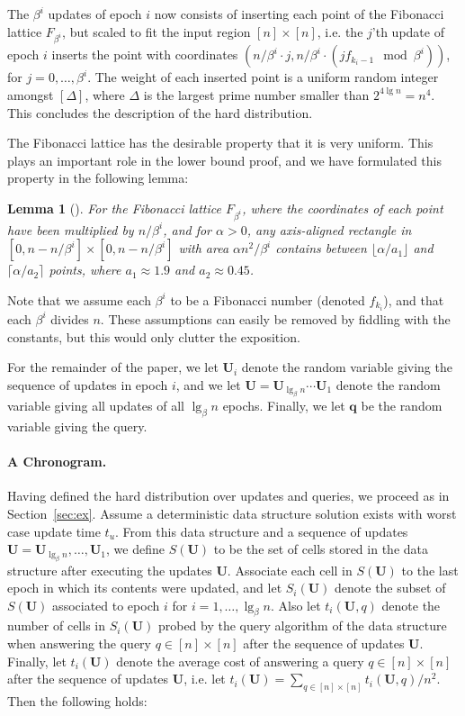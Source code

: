 \documentclass[letterpaper]{article}
\newtheorem{lemma}{Lemma}
\newcommand{\U}{\textbf{U}}
\newcommand{\q}{\textbf{q}}
\begin{document}
The $\beta^i$ updates of epoch $i$ now consists of inserting each
point of the Fibonacci lattice $F_{\beta^i}$, but scaled to fit the
input region $[n] \times [n]$, i.e. the $j$'th update of epoch $i$
inserts the point with coordinates $(n/\beta^i \cdot j,n/\beta^i \cdot
(jf_{k_i-1} \mod \beta^i))$, for $j=0,\dots,\beta^i$. The weight of
each inserted point is a uniform random integer amongst
$[\Delta]$, where $\Delta$ is the largest prime number
smaller than $2^{4 \lg n}=n^4$. This concludes the description of the hard
distribution.

The Fibonacci lattice has the desirable property that it is very
uniform. This plays an important role in the lower bound proof, and we
have formulated this property in the following lemma:

\begin{lemma}[\cite{fibonacci}]
\label{lem:fibarea}
For the Fibonacci lattice $F_{\beta^i}$, where the coordinates of each
point have been multiplied by $n/\beta^i$, and for $\alpha>0$, any
axis-aligned rectangle in $[0,n-n/\beta^i] \times [0,n-n/\beta^i]$
with area $\alpha n^2/\beta^i$ contains between $\lfloor \alpha / a_1
\rfloor$ and $\lceil \alpha/a_2 \rceil$ points, where $a_1 \approx
1.9$ and $a_2 \approx 0.45$.
\end{lemma}

Note that we assume each $\beta^i$ to be a Fibonacci number (denoted
$f_{k_i}$), and that each $\beta^i$ divides $n$. These assumptions can
easily be removed by fiddling with the constants, but this would only
clutter the exposition.

For the remainder of the paper, we let $\U_i$ denote the random
variable giving the sequence of updates in epoch $i$, and we let
$\U=\U_{\lg_\beta n}\cdots\U_1$ denote the random variable giving all
updates of all $\lg_\beta n$ epochs. Finally, we let $\q$ be the
random variable giving the query.

\paragraph{A Chronogram.}
Having defined the hard distribution over updates and queries, we
proceed as in Section~\ref{sec:ex}. Assume a deterministic data
structure solution exists with worst case update time $t_u$. From this
data structure and a sequence of updates $\U=\U_{\lg_\beta
  n},\dots,\U_1$, we define $S(\U)$ to be the set of cells stored in
the data structure after executing the updates $\U$. Associate each
cell in $S(\U)$ to the last epoch in which its contents were updated,
and let $S_i(\U)$ denote the subset of $S(\U)$ associated to epoch $i$
for $i=1,\dots,\lg_\beta n$. Also let $t_i(\U,q)$ denote the number of
cells in $S_i(\U)$ probed by the query algorithm of the data structure
when answering the query $q \in [n] \times [n]$ after the sequence of
updates $\U$. Finally, let $t_i(\U)$ denote the average cost of
answering a query $q \in [n] \times [n]$ after the sequence of updates
$\U$, i.e. let $t_i(\U) = \sum_{q \in [n] \times [n]}t_i(\U,q)/n^2$. Then
the following holds:
\end{document}
